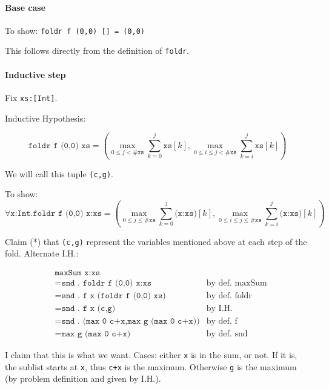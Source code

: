 \documentclass[10pt,a4paper]{article}
\newcommand{\just}[2]{\texttt{#1} & \textrm{#2}}
\begin{document}
\paragraph{Base case}
To show: \texttt{foldr f (0,0) [] = (0,0)}

This follows directly from the definition of \texttt{foldr}.

\paragraph{Inductive step}
Fix \texttt{xs:[Int]}.

Inductive Hypothesis:

\[ \texttt{foldr f (0,0) xs} =
(\max_{0\le j < \texttt{\#xs}} \sum_{k=0}^{j} \texttt{xs}[k],
\max_{0\le i \le j < \texttt{\#xs}} \sum_{k=i}^{j} \texttt{xs}[k]) \]

We will call this tuple \texttt{(c,g)}.

To show:
\[ \forall \texttt{x:Int.foldr f (0,0) x:xs} =
(\max_{0\le j \le \texttt{\#xs}} \sum_{k=0}^{j} \texttt{(x:xs)}[k],
\max_{0\le i \le j \le \texttt{\#xs}} \sum_{k=i}^{j} \texttt{(x:xs)}[k]) \]

Claim (*) that \texttt{(c,g)} represent the variables mentioned above at each step of the fold. Alternate I.H.:

\begin{align*}
& \texttt{maxSum x:xs} \\
&= \just{snd . foldr f (0,0) x:xs}{by def. maxSum} \\
&= \just{snd . f x (foldr f (0,0) xs)}{by def. foldr} \\
&= \just{snd . f x (c,g)}{by I.H.} \\
&= \just{snd . (max 0 c+x,max g (max 0 c+x))}{by def. f} \\
&= \just{max g (max 0 c+x)}{by def. snd}
\end{align*}

I claim that this is what we want.
Cases: either \texttt{x} is in the sum, or not.
If it is, the sublist starts at \texttt{x}, thus \texttt{c+x} is the maximum.
Otherwise \texttt{g} is the maximum (by problem definition and given by I.H.).
\end{document}
